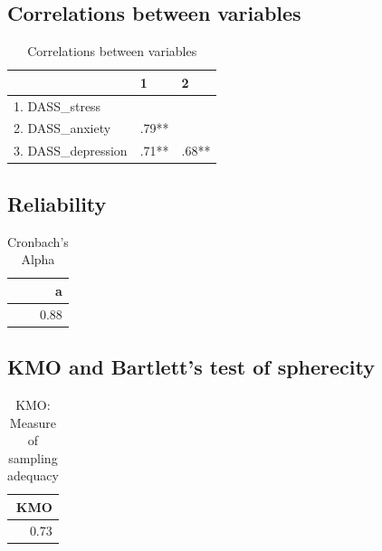 \documentclass[]{article}
\begin{document}
\hypertarget{correlations-between-variables-4}{%
\subsection{Correlations between
variables}\label{correlations-between-variables-4}}

\begin{table}[H]

\caption{\label{tab:unnamed-chunk-22}Correlations between variables}
\centering
\fontsize{6}{8}\selectfont
\begin{tabular}[t]{lll}
\toprule
  & 1 & 2\\
\midrule
1. DASS\_stress &  & \\
2. DASS\_anxiety & .79** & \\
3. DASS\_depression & .71** & .68**\\
\bottomrule
\end{tabular}
\end{table}

\hypertarget{reliability-3}{%
\subsection{Reliability}\label{reliability-3}}

\begin{table}[H]

\caption{\label{tab:unnamed-chunk-23}Cronbach's Alpha}
\centering
\fontsize{6}{8}\selectfont
\begin{tabular}[t]{r}
\toprule
a\\
\midrule
0.88\\
\bottomrule
\end{tabular}
\end{table}

\hypertarget{kmo-and-bartletts-test-of-spherecity-4}{%
\subsection{KMO and Bartlett's test of
spherecity}\label{kmo-and-bartletts-test-of-spherecity-4}}

\begin{table}[H]

\caption{\label{tab:unnamed-chunk-24}KMO: Measure of sampling adequacy}
\centering
\fontsize{6}{8}\selectfont
\begin{tabular}[t]{r}
\toprule
KMO\\
\midrule
0.73\\
\bottomrule
\end{tabular}
\end{table}
\end{document}
